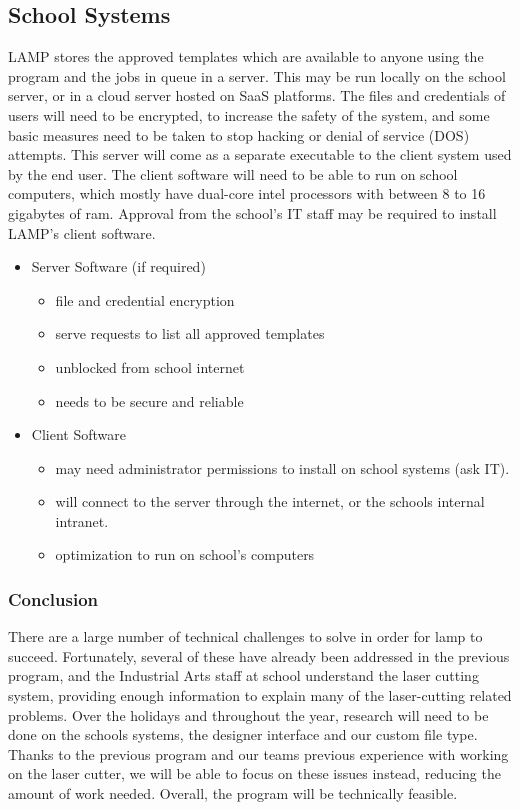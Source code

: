 \documentclass[oneside,openany,11pt,a4paper]{report}
\begin{document}
\subsection{School Systems}
LAMP stores the approved templates which are available to anyone using the program and the jobs in queue in a server. This may be run locally on the school server, or in a cloud server hosted on SaaS platforms. The files and credentials of users will need to be encrypted, to increase the safety of the system, and some basic measures need to be taken to stop hacking or denial of service (DOS) attempts. This server will come as a separate executable to the client system used by the end user. The client software will need to be able to run on school computers, which mostly have dual-core intel processors with between 8 to 16 gigabytes of ram. Approval from the school’s IT staff may be required to install LAMP’s client software. 
\begin{itemize}
	\item Server Software (if required)
	\begin{itemize}
		\itemsep0em
        \item file and credential encryption
        \item serve requests to list all approved templates
        \item unblocked from school internet 
        \item needs to be secure and reliable
    \end{itemize}
    
    \item Client Software
    \begin{itemize} 
    	\itemsep0em
        \item may need administrator permissions to install on school systems (ask IT).
    	\item will connect to the server through the internet, or the schools internal intranet.
        \item optimization to run on school’s computers
	\end{itemize}
\end{itemize}

\subsubsection{Conclusion}
There are a large number of technical challenges to solve in order for lamp to succeed. Fortunately, several of these have already been addressed in the previous program, and the Industrial Arts staff at school understand the laser cutting system, providing enough information to explain many of the laser-cutting related problems. Over the holidays and throughout the year, research will need to be done on the schools systems, the designer interface and our custom file type. Thanks to the previous program and our teams previous experience with working on the laser cutter, we will be able to focus on these issues instead, reducing the amount of work needed. Overall, the program will be technically feasible. 
\end{document}
